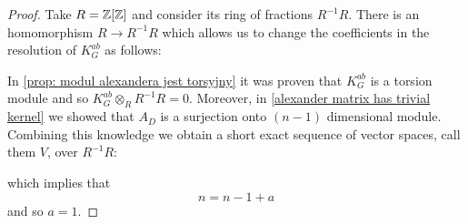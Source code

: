 \begin{proof}
  Take $R=\operatorname{\mathbb{Z}}[\operatorname{\mathbb{Z}}]$ and consider its ring of fractions $R^{-1}R$. There is an homomorphism $R\to R^{-1}R$ which allows us to change the coefficients in the resolution of $K_G^{ab}$ as follows:
  \begin{center}
  \end{center}
  In \cref{prop: modul alexandera jest torsyjny} it was proven that $K_G^{ab}$ is a torsion module and so $K_G^{ab}\otimes_R R^{-1}R=0$. Moreover, in \cref{alexander matrix has trivial kernel} we showed that $A_D$ is a surjection onto $(n-1)$ dimensional module. Combining this knowledge we obtain a short exact sequence of vector spaces, call them $V$, over $R^{-1}R$:
  \begin{center}
  \end{center}
  which implies that 
  $$n=n-1+a$$ 
  and so $a=1$.
\end{proof}


